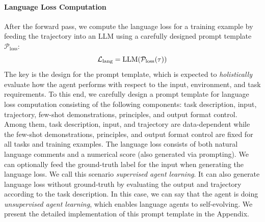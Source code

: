\paragraph{Language Loss Computation}
After the forward pass, we compute the language loss for a training example by feeding the trajectory into an LLM using a carefully designed prompt template $\mathcal{P}_{\text{loss}}$: 
\begin{equation}
    \mathcal{L}_{\text{lang}} = \text{LLM}( \mathcal{P}_{\text{loss}}(\tau))
\end{equation}
The key is the design for the prompt template, which is expected to \textit{holistically} evaluate how the agent performs with respect to the input, environment, and task requirements. To this end, we carefully design a prompt template for language loss computation consisting of the following components: task description, input, trajectory, few-shot demonstrations, principles, and output format control. Among them, task description, input, and trajectory are data-dependent while the few-shot demonstrations, principles, and output format control are fixed for all tasks and training examples. The language loss consists of both natural language comments and a numerical score (also generated via prompting). We can optionally feed the ground-truth label for the input when generating the language loss. We call this scenario \textit{supervised agent learning}. It can also generate language loss without ground-truth by evaluating the output and trajectory according to the task description. In this case, we can say that the agent is doing \textit{unsupervised agent learning}, which enables language agents to self-evolving.
We present the detailed implementation of this prompt template in the Appendix.

